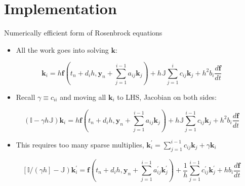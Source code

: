 \documentclass[serif]{beamer}
\begin{document}
\section{Implementation}

\begin{frame}{Numerically efficient form of Rosenbrock equations}
  \begin{itemize}
    \item All the work goes into solving $\mathbf{k}$:
  \end{itemize}
  \begin{equation}
    \nonumber 
    \mathbf{k}_{i} = h\mathbf{f} \left(t_n + d_ih,\mathbf{y}_n + \sum_{j=1}^{i-1}a_{ij}\mathbf{k}_{j}\right) 
                   + h\mathbb{J}\sum_{j=1}^i c_{ij}\mathbf{k}_{j}  + h^2b_i\frac{d\mathbf{f}}{dt}
  \end{equation}
  \begin{itemize}
    \item Recall $\gamma\equiv c_{ii}$ and moving all $\mathbf{k}_i$ to LHS, \alert{Jacobian on both sides}:
  \end{itemize}
    \begin{equation}
    \nonumber 
    \left(\mathbb{I} - \gamma h \mathbb{J}\right)\mathbf{k}_{i} = h\mathbf{f} \left(t_n + d_ih,\mathbf{y}_n + \sum_{j=1}^{i-1}a_{ij}\mathbf{k}_{j}\right) 
                   + h\mathbb{J}\sum_{j=1}^{i-1} c_{ij}\mathbf{k}_{j}  + h^2b_i\frac{d\mathbf{f}}{dt}
  \end{equation}
  \begin{itemize}
    \item This requires too many sparse multiplies, $\mathbf{k}^\prime_i=\sum_{j=1}^{i-1}c_{ij}\mathbf{k}_j + \gamma\mathbf{k}_i$
  \end{itemize}
  \begin{equation}
    \nonumber 
    \left[\mathbb{I}/\left(\gamma h\right] - \mathbb{J}\right)\mathbf{k}^\prime_{i} = \mathbf{f} \left(t_n + d_ih,\mathbf{y}_n + \sum_{j=1}^{i-1}a^\prime_{ij}\mathbf{k}^\prime_{j}\right) 
                   + \frac{1}{h}\sum_{j=1}^{i-1} c^\prime_{ij}\mathbf{k}^\prime_{j}  + hb_i\frac{d\mathbf{f}}{dt}
  \end{equation}
\end{frame}
\end{document}
